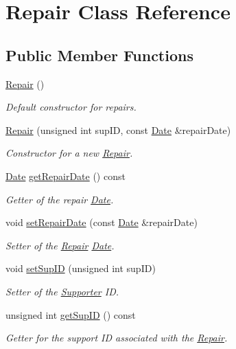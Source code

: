 \hypertarget{class_repair}{}\section{Repair Class Reference}
\label{class_repair}
\subsection*{Public Member Functions}
\begin{DoxyCompactItemize}
\item 
\mbox{\label{class_repair_afeed75d242ccedc8eb754e7f045423b1}} 
\mbox{\hyperlink{class_repair_afeed75d242ccedc8eb754e7f045423b1}{Repair}} ()
\begin{DoxyCompactList}\small\item\em Default constructor for repairs. \end{DoxyCompactList}\item 
\mbox{\hyperlink{class_repair_ac02c65d28404cac9a7d1795bd1196f9e}{Repair}} (unsigned int sup\+ID, const \mbox{\hyperlink{class_date}{Date}} \&repair\+Date)
\begin{DoxyCompactList}\small\item\em Constructor for a new \mbox{\hyperlink{class_repair}{Repair}}. \end{DoxyCompactList}\item 
\mbox{\hyperlink{class_date}{Date}} \mbox{\hyperlink{class_repair_ab877a9f5af222debc30790047ef3a098}{get\+Repair\+Date}} () const
\begin{DoxyCompactList}\small\item\em Getter of the repair \mbox{\hyperlink{class_date}{Date}}. \end{DoxyCompactList}\item 
void \mbox{\hyperlink{class_repair_a7c75483403ed47f71668740115a38f71}{set\+Repair\+Date}} (const \mbox{\hyperlink{class_date}{Date}} \&repair\+Date)
\begin{DoxyCompactList}\small\item\em Setter of the \mbox{\hyperlink{class_repair}{Repair}} \mbox{\hyperlink{class_date}{Date}}. \end{DoxyCompactList}\item 
void \mbox{\hyperlink{class_repair_a22397013bb177a54a104cabdbb578900}{set\+Sup\+ID}} (unsigned int sup\+ID)
\begin{DoxyCompactList}\small\item\em Setter of the \mbox{\hyperlink{class_supporter}{Supporter}} ID. \end{DoxyCompactList}\item 
unsigned int \mbox{\hyperlink{class_repair_a0aa4bf5af38b5f4b96bfcadfa8b60318}{get\+Sup\+ID}} () const
\begin{DoxyCompactList}\small\item\em Getter for the support ID associated with the \mbox{\hyperlink{class_repair}{Repair}}. \end{DoxyCompactList}\end{DoxyCompactItemize}
